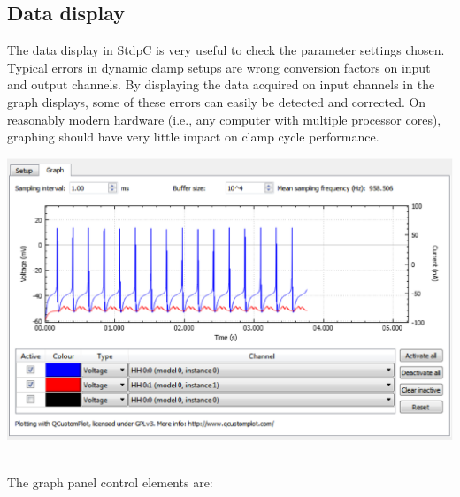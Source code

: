 \documentclass{article}
\begin{document}
\subsection{Data display}
The data display in StdpC is very useful to check the parameter
settings chosen. Typical errors in dynamic clamp setups are wrong
conversion factors on input and output channels. By displaying the
data acquired on input channels in the graph displays, some of these
errors can easily be detected and corrected. On reasonably modern
hardware (i.e., any computer with multiple processor cores), graphing
should have very little impact on clamp cycle performance. \\[0.2cm]
\parbox{\textwidth}{
  \includegraphics[scale=0.6]{graphBlock}
} \\[0.2cm]
The graph panel control elements are:
\end{document}
